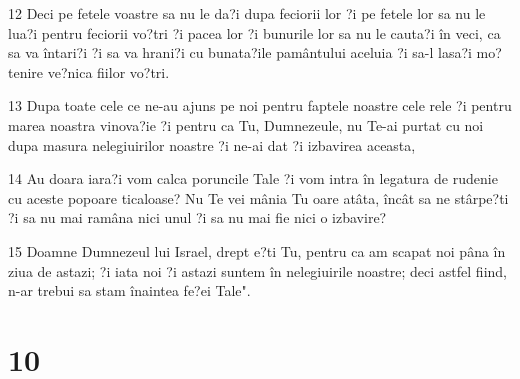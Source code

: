 \par 12 Deci pe fetele voastre sa nu le da?i dupa feciorii lor ?i pe fetele lor sa nu le lua?i pentru feciorii vo?tri ?i pacea lor ?i bunurile lor sa nu le cauta?i în veci, ca sa va întari?i ?i sa va hrani?i cu bunata?ile pamântului aceluia ?i sa-l lasa?i mo?tenire ve?nica fiilor vo?tri.
\par 13 Dupa toate cele ce ne-au ajuns pe noi pentru faptele noastre cele rele ?i pentru marea noastra vinova?ie ?i pentru ca Tu, Dumnezeule, nu Te-ai purtat cu noi dupa masura nelegiuirilor noastre ?i ne-ai dat ?i izbavirea aceasta,
\par 14 Au doara iara?i vom calca poruncile Tale ?i vom intra în legatura de rudenie cu aceste popoare ticaloase? Nu Te vei mânia Tu oare atâta, încât sa ne stârpe?ti ?i sa nu mai ramâna nici unul ?i sa nu mai fie nici o izbavire?
\par 15 Doamne Dumnezeul lui Israel, drept e?ti Tu, pentru ca am scapat noi pâna în ziua de astazi; ?i iata noi ?i astazi suntem în nelegiuirile noastre; deci astfel fiind, n-ar trebui sa stam înaintea fe?ei Tale".

\chapter{10}

